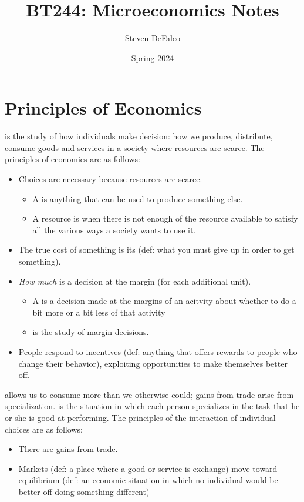 \documentclass{article}
\title{BT244: Microeconomics Notes}
\author{Steven DeFalco}
\date{Spring 2024}
\begin{document}
\maketitle
\tableofcontents
\newpage


\section{Principles of Economics}

 is the study of how individuals make decision: how we produce, distribute, consume goods and services in a society where resources are scarce. The principles of economics are as follows: 
\begin{itemize}
  \item Choices are necessary because resources are scarce. 
    \begin{itemize}
      \item A  is anything that can be used to produce something else. 
      \item A resource is  when there is not enough of the resource available to satisfy all the various ways a society wants to use it. 
    \end{itemize}
  \item The true cost of something is its  (def: what you must give up in order to get something). 
  \item \emph{How much} is a decision at the margin (for each additional unit). 
    \begin{itemize}
      \item A  is a decision made at the margins of an acitvity about whether to do a bit more or a bit less of that activity 
      \item {} is the study of margin decisions.
    \end{itemize}
  \item People respond to incentives (def: anything that offers rewards to people who change their behavior), exploiting opportunities to make themselves better off. 
\end{itemize}

 allows us to consume more than we otherwise could; gains from trade arise from specialization.  is the situation in which each person specializes in the task that he or she is good at performing. The principles of the interaction of individual choices are as follows: 
\begin{itemize}
  \item There are gains from trade. 
  \item Markets (def: a place where a good or service is exchange) move toward equilibrium (def: an economic situation in which no individual would be better off doing something different)
\end{itemize}
\end{document}
